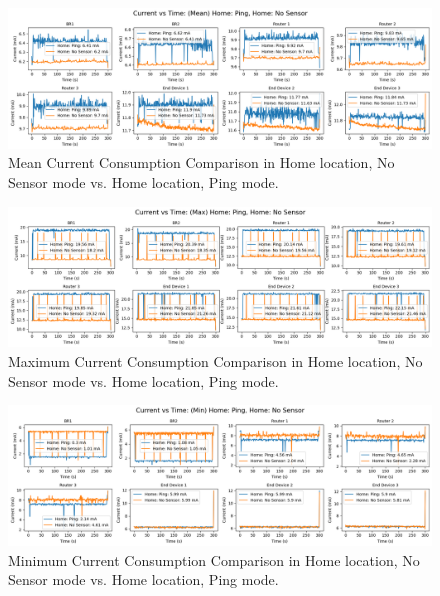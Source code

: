 \begin{figure}[H]
  \centering
  \includegraphics[width=1\textwidth]{images/research_results/current_consumption_analysis/maximum/home/ping/comparison/home_no-sensor_vs_home_ping/mean_comparison_home_no-sensor_vs_home_ping.png}
    \caption{Mean Current Consumption Comparison in Home location, No Sensor mode vs. Home location, Ping mode.}
    \label{fig:mean_comparison_home_no-sensor_vs_home_ping}
\end{figure}

\begin{figure}[H]
  \centering
  \includegraphics[width=1\textwidth]{images/research_results/current_consumption_analysis/maximum/home/ping/comparison/home_no-sensor_vs_home_ping/max_comparison_home_no-sensor_vs_home_ping.png}
    \caption{Maximum Current Consumption Comparison in Home location, No Sensor mode vs. Home location, Ping mode.}
    \label{fig:max_comparison_home_no-sensor_vs_home_ping}
\end{figure}

\begin{figure}[H]
  \centering
  \includegraphics[width=1\textwidth]{images/research_results/current_consumption_analysis/maximum/home/ping/comparison/home_no-sensor_vs_home_ping/min_comparison_home_no-sensor_vs_home_ping.png}
    \caption{Minimum Current Consumption Comparison in Home location, No Sensor mode vs. Home location, Ping mode.}
    \label{fig:min_comparison_home_no-sensor_vs_home_ping}
\end{figure}

